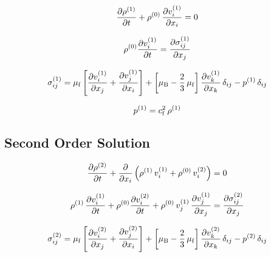 \begin{equation}
  \pdv{  \rho^{(1)}  }{t} + \rho^{(0)}\,\pdv{  v_{i}^{(1)}  }{x_{i}} = 0
  \label{eq:Th-st-massconservatio}
\end{equation}

\begin{equation}
  \rho^{(0)} \pdv{  v_{i}^{(1)}  }{t} = \pdv{  \sigma_{ij}^{(1)}  }{x_{j}}
  \label{eq:Th-st-navier}
\end{equation}

\begin{equation}
  \sigma_{ij}^{(1)} = \mu_{\mathrm{f}}\left[ \pdv{  v_{i}^{(1)}  }{x_{j}} + 
  \pdv{  v_{j}^{(1)}  }{x_{i}} \right] + \left[ \mu_{\mathrm{B}} - 
  \frac{2}{3}\,\mu_{\mathrm{f}} \right] \pdv{  v_{k}^{(1)}  }{x_{k}} \,\delta_{ij} - 
  p^{(1)}\,\delta_{ij}
  \label{eq:Th-st-stress}
\end{equation}

\begin{equation}
  p^{(1)} = c_{\mathrm{f}}^{2}\,\rho^{(1)}
  \label{eq:Th-st-pre}
\end{equation}



\subsection{Second Order Solution\label{sec:Th-secondorder}}

\begin{equation}
  \pdv{  \rho^{(2)}  }{t} + \pdv{x_{i}}\left(\rho^{(1)}\,v_{i}^{(1)} 
  + \rho^{(0)}\,v_{i}^{(2)} \right) = 0
  \label{eq:Th-nd-massconservatio}
\end{equation}

\begin{equation}
  \rho^{(1)}\,\pdv{  v_{i}^{(1)}  }{t} + \rho^{(0)} 
  \pdv{  v_{i}^{(2)}  }{t} + 
  \rho^{(0)}\,v_{j}^{(1)}\,\pdv{  v_{j}^{(1)}  }{x_{j}} = 
  \pdv{  \sigma_{ij}^{(2)}  }{x_{j}}
  \label{eq:Th-nd-navier}
\end{equation}

\begin{equation}
  \sigma_{ij}^{(2)} = \mu_{\mathrm{f}}\left[ \pdv{  v_{i}^{(2)}  }{x_{j}} + 
  \pdv{  v_{j}^{(2)}  }{x_{i}} \right] + \left[ \mu_{\mathrm{B}} - 
  \frac{2}{3}\,\mu_{\mathrm{f}} \right] \pdv{  v_{k}^{(2)}  }{x_{k}} \,\delta_{ij} - 
  p^{(2)}\,\delta_{ij}
  \label{eq:Th-nd-stress}
\end{equation}


